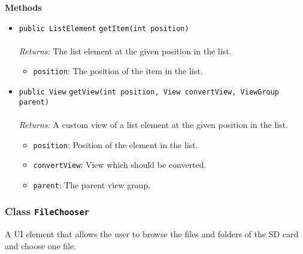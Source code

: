 \textbf{\sffamily Methods}
\begin{itemize}
\item \lstinline|public ListElement| \lstinline|getItem|\lstinline|(int position)|\\ \\[-0.6em]
\emph{Returns:} The list element at the given position in the list.
\begin{itemize}
\item \lstinline|position|: The position of the item in the list.
\end{itemize}



\item \lstinline|public View| \lstinline|getView|\lstinline|(int position, View convertView, ViewGroup parent)|\\ \\[-0.6em]
\emph{Returns:} A custom view of a list element at the given position in the list.
\begin{itemize}
\item \lstinline|position|: Position of the element in the list.
\item \lstinline|convertView|: View which should be converted.
\item \lstinline|parent|: The parent view group.
\end{itemize}



\end{itemize}

\subsubsection{Class \lstinline|FileChooser|}
A UI element that allows the user to browse the files and folders of the SD card and
 choose one file. \\
\noindent\begin{minipage}[t]{5cm}
\vspace{0.3em}
\hspace*{2em}
\vspace{0.3em}
\end{minipage}




